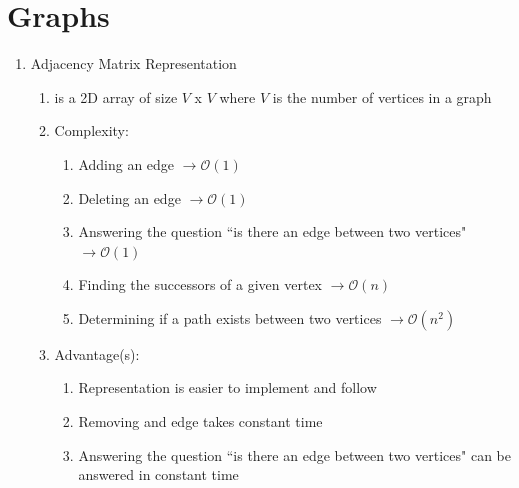\documentclass [12pt, executivepaper]{article}
\begin{document}
\pagebreak

\vspace*{-40mm}

\section*{Graphs}

\begin{enumerate}

\item Adjacency Matrix Representation

\begin{enumerate}

\item is a 2D array of size $V$ x $V$ where $V$ is the number of vertices in a graph

\item Complexity:

\begin{enumerate}

\item Adding an edge $\rightarrow \mathcal{O}(1)$

\item Deleting an edge $\rightarrow \mathcal{O}(1)$

\item Answering the question ``is there an edge between two vertices" $\rightarrow \mathcal{O}(1)$

\item Finding the successors of a given vertex $\rightarrow \mathcal{O}(n)$

\item Determining if a path exists between two vertices $\rightarrow \mathcal{O}(n^2)$

\end{enumerate}

\item Advantage(s):

\begin{enumerate}

\item Representation is easier to implement and follow

\item Removing and edge takes constant time

\item Answering the question ``is there an edge between two vertices" can be answered in constant time


\end{enumerate}
\end{enumerate}
\end{enumerate}
\end{document}
